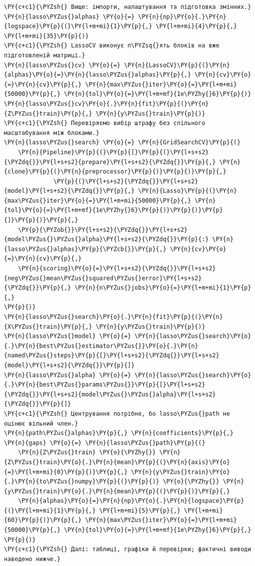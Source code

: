 \begin{Verbatim}[commandchars=\\\{\}]
\PY{c+c1}{\PYZsh{} Вище: імпорти, налаштування та підготовка змінних.}
\PY{n}{lasso\PYZus{}alphas} \PY{o}{=} \PY{n}{np}\PY{o}{.}\PY{n}{logspace}\PY{p}{(}\PY{l+m+mi}{1}\PY{p}{,} \PY{l+m+mi}{4}\PY{p}{,} \PY{l+m+mi}{35}\PY{p}{)}
\PY{c+c1}{\PYZsh{} LassoCV виконує п\PYZsq{}ять блоків на вже підготовленій матриці.}
\PY{n}{lasso\PYZus{}cv} \PY{o}{=} \PY{n}{LassoCV}\PY{p}{(}\PY{n}{alphas}\PY{o}{=}\PY{n}{lasso\PYZus{}alphas}\PY{p}{,} \PY{n}{cv}\PY{o}{=}\PY{n}{cv}\PY{p}{,} \PY{n}{max\PYZus{}iter}\PY{o}{=}\PY{l+m+mi}{50000}\PY{p}{,} \PY{n}{tol}\PY{o}{=}\PY{l+m+mf}{1e\PYZhy{}6}\PY{p}{)}
\PY{n}{lasso\PYZus{}cv}\PY{o}{.}\PY{n}{fit}\PY{p}{(}\PY{n}{Z\PYZus{}train}\PY{p}{,} \PY{n}{y\PYZus{}train}\PY{p}{)}
\PY{c+c1}{\PYZsh{} Перевіряємо вибір штрафу без спільного масштабування між блоками.}
\PY{n}{lasso\PYZus{}search} \PY{o}{=} \PY{n}{GridSearchCV}\PY{p}{(}
    \PY{n}{Pipeline}\PY{p}{(}\PY{p}{[}\PY{p}{(}\PY{l+s+s2}{\PYZdq{}}\PY{l+s+s2}{prepare}\PY{l+s+s2}{\PYZdq{}}\PY{p}{,} \PY{n}{clone}\PY{p}{(}\PY{n}{preprocessor}\PY{p}{)}\PY{p}{)}\PY{p}{,}
              \PY{p}{(}\PY{l+s+s2}{\PYZdq{}}\PY{l+s+s2}{model}\PY{l+s+s2}{\PYZdq{}}\PY{p}{,} \PY{n}{Lasso}\PY{p}{(}\PY{n}{max\PYZus{}iter}\PY{o}{=}\PY{l+m+mi}{50000}\PY{p}{,} \PY{n}{tol}\PY{o}{=}\PY{l+m+mf}{1e\PYZhy{}6}\PY{p}{)}\PY{p}{)}\PY{p}{]}\PY{p}{)}\PY{p}{,}
    \PY{p}{\PYZob{}}\PY{l+s+s2}{\PYZdq{}}\PY{l+s+s2}{model\PYZus{}\PYZus{}alpha}\PY{l+s+s2}{\PYZdq{}}\PY{p}{:} \PY{n}{lasso\PYZus{}alphas}\PY{p}{\PYZcb{}}\PY{p}{,} \PY{n}{cv}\PY{o}{=}\PY{n}{cv}\PY{p}{,}
    \PY{n}{scoring}\PY{o}{=}\PY{l+s+s2}{\PYZdq{}}\PY{l+s+s2}{neg\PYZus{}mean\PYZus{}squared\PYZus{}error}\PY{l+s+s2}{\PYZdq{}}\PY{p}{,} \PY{n}{n\PYZus{}jobs}\PY{o}{=}\PY{l+m+mi}{1}\PY{p}{,}
\PY{p}{)}
\PY{n}{lasso\PYZus{}search}\PY{o}{.}\PY{n}{fit}\PY{p}{(}\PY{n}{X\PYZus{}train}\PY{p}{,} \PY{n}{y\PYZus{}train}\PY{p}{)}
\PY{n}{lasso\PYZus{}model} \PY{o}{=} \PY{n}{lasso\PYZus{}search}\PY{o}{.}\PY{n}{best\PYZus{}estimator\PYZus{}}\PY{o}{.}\PY{n}{named\PYZus{}steps}\PY{p}{[}\PY{l+s+s2}{\PYZdq{}}\PY{l+s+s2}{model}\PY{l+s+s2}{\PYZdq{}}\PY{p}{]}
\PY{n}{lasso\PYZus{}alpha} \PY{o}{=} \PY{n}{lasso\PYZus{}search}\PY{o}{.}\PY{n}{best\PYZus{}params\PYZus{}}\PY{p}{[}\PY{l+s+s2}{\PYZdq{}}\PY{l+s+s2}{model\PYZus{}\PYZus{}alpha}\PY{l+s+s2}{\PYZdq{}}\PY{p}{]}
\PY{c+c1}{\PYZsh{} Центрування потрібне, бо lasso\PYZus{}path не оцінює вільний член.}
\PY{n}{path\PYZus{}alphas}\PY{p}{,} \PY{n}{coefficients}\PY{p}{,} \PY{n}{gaps} \PY{o}{=} \PY{n}{lasso\PYZus{}path}\PY{p}{(}
    \PY{n}{Z\PYZus{}train} \PY{o}{\PYZhy{}} \PY{n}{Z\PYZus{}train}\PY{o}{.}\PY{n}{mean}\PY{p}{(}\PY{n}{axis}\PY{o}{=}\PY{l+m+mi}{0}\PY{p}{)}\PY{p}{,} \PY{n}{y\PYZus{}train}\PY{o}{.}\PY{n}{to\PYZus{}numpy}\PY{p}{(}\PY{p}{)} \PY{o}{\PYZhy{}} \PY{n}{y\PYZus{}train}\PY{o}{.}\PY{n}{mean}\PY{p}{(}\PY{p}{)}\PY{p}{,}
    \PY{n}{alphas}\PY{o}{=}\PY{n}{np}\PY{o}{.}\PY{n}{logspace}\PY{p}{(}\PY{l+m+mi}{1}\PY{p}{,} \PY{l+m+mi}{5}\PY{p}{,} \PY{l+m+mi}{60}\PY{p}{)}\PY{p}{,} \PY{n}{max\PYZus{}iter}\PY{o}{=}\PY{l+m+mi}{50000}\PY{p}{,} \PY{n}{tol}\PY{o}{=}\PY{l+m+mf}{1e\PYZhy{}6}\PY{p}{,}
\PY{p}{)}
\PY{c+c1}{\PYZsh{} Далі: таблиці, графіки й перевірки; фактичні виводи наведено нижче.}
\end{Verbatim}
